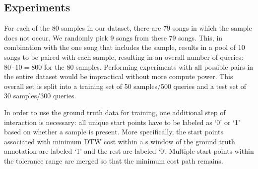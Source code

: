 \documentclass{article}
\begin{document}
\subsection{Experiments}
\label{exp}
For each of the 80 samples in our dataset, there are 79 songs in which the sample does not occur. We randomly pick 9 songs from these 79 songs. This, in combination with the one song that includes the sample, results in a pool of 10 songs to be paired with each sample, resulting in an overall number of queries: $80\cdot10 = 800$ for the $80$ samples. Performing experiments with all possible pairs in the entire dataset would be impractical without more compute power.
%
This overall set is split into a training set of 50 samples/500 queries and a test set of 30 samples/300 queries.

In order to use the ground truth data for training, one additional step of interaction is necessary: all unique start points have to be labeled as `0' or `1' based on whether a sample is present. %
More specifically, the start points associated with minimum DTW cost within a \unit[1]{s} window of the ground truth annotation are labeled `1' and the rest are labeled `0'. Multiple start points within the tolerance range are merged so that the minimum cost path remains. 

\end{document}
